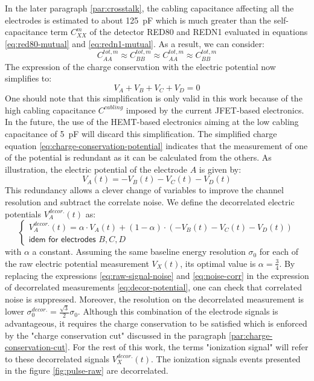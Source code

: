 In the later paragraph \ref{par:crosstalk}, the cabling capacitance affecting all the electrodes is estimated to about \SI{125}{\pico\farad} which is much greater than the self-capacitance term $C_{XX}^m$ of the detector RED80 and REDN1 evaluated in equations \ref{eq:red80-mutual} and \ref{eq:redn1-mutual}. As a result, we can consider:
\begin{equation}
C_{AA}^{tot, m} \approx C_{BB}^{tot, m} \approx C_{AA}^{tot, m} \approx C_{BB}^{tot, m}
\end{equation}
The expression of the charge conservation with the electric potential now simplifies to:
\begin{equation}
\label{eq:charge-conservation-potential}
V_A + V_B + V_C + V_D = 0
\end{equation}
One should note that this simplification is only valid in this work because of the high cabling capacitance $C^{cabling}$ imposed by the current JFET-based electronics. In the future, the use of the HEMT-based electronics aiming at the low cabling capacitance of \SI{5}{\pico\farad} will discard this simplification.
The simplified charge equation \ref{eq:charge-conservation-potential} indicates that the measurement of one of the potential is redundant as it can be calculated from the others. As illustration, the electric potential of the electrode $A$ is given by:
\begin{equation}
V_A(t) = -V_B(t) - V_C(t) - V_D(t)
\end{equation}
This redundancy allows a clever change of variables to improve the channel resolution and subtract the correlate noise. We define the decorrelated electric potentials $V_A^{decor.}(t)$ as:
\begin{equation}
\label{eq:decor-potential}
\begin{cases}
V_A^{decor.}(t) = \alpha \cdot V_A(t) + (1-\alpha) \cdot ( -V_B(t) - V_C(t) - V_D(t)) \\
\textsf{idem for electrodes } B, C, D
\end{cases}
\end{equation}
with $\alpha$ a constant. Assuming the same baseline energy resolution $\sigma_0$ for each of the raw electric potential measurement $V_X(t)$, its optimal value is $\alpha=\frac{3}{4}$. By replacing the expressions \ref{eq:raw-signal-noise} and \ref{eq:noise-corr} in the expression of decorrelated measurements \ref{eq:decor-potential}, one can check that correlated noise is suppressed. Moreover, the resolution on the decorrelated measurement is lower $\sigma_0^{decor.} = \frac{\sqrt{3}}{2} \sigma_0$. Although this combination of the electrode signals is advantageous, it requires the charge conservation to be satisfied which is enforced by the "charge conservation cut" discussed in the paragraph \ref{par:charge-conservation-cut}. For the rest of this work, the terms "ionization signal" will refer to these decorrelated signals $V_X^{decor.}(t)$. The ionization signals events presented in the figure \ref{fig:pulse-raw} are decorrelated.

